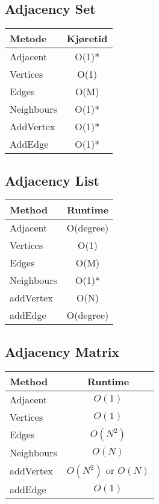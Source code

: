 \documentclass{article}
\begin{document}
\subsection{Adjacency Set}
\begin{table}[h!]
\centering
\begin{tabular}{|l|c|}
\hline
\textbf{Metode} & \textbf{Kjøretid} \\
\hline
Adjacent & O(1)* \\
\hline
Vertices & O(1) \\
\hline
Edges & O(M) \\
\hline
Neighbours & O(1)* \\
\hline
AddVertex & O(1)* \\
\hline
AddEdge & O(1)* \\
\hline
\end{tabular}
\end{table}


\subsection{Adjacency List}
\begin{table}[h!]
\centering
\begin{tabular}{|l|c|}
\hline
\textbf{Method} & \textbf{Runtime} \\
\hline
Adjacent & O(degree) \\
\hline
Vertices & O(1) \\
\hline
Edges & O(M) \\
\hline
Neighbours & O(1)* \\
\hline
addVertex & O(N) \\
\hline
addEdge & O(degree) \\
\hline
\end{tabular}
\end{table}

\newpage

\subsection{Adjacency Matrix}
\begin{table}[!ht]
\centering
\begin{tabular}{|l|c|}
\hline
\textbf{Method} & \textbf{Runtime} \\
\hline
Adjacent & $O(1)$ \\
\hline
Vertices & $O(1)$ \\
\hline
Edges & $O(N^2)$ \\
\hline
Neighbours & $O(N)$ \\
\hline 
addVertex & $O(N^2)$ or $O(N)$ \\
\hline
addEdge & $O(1)$ \\
\hline
\end{tabular}
\end{table}
\end{document}
